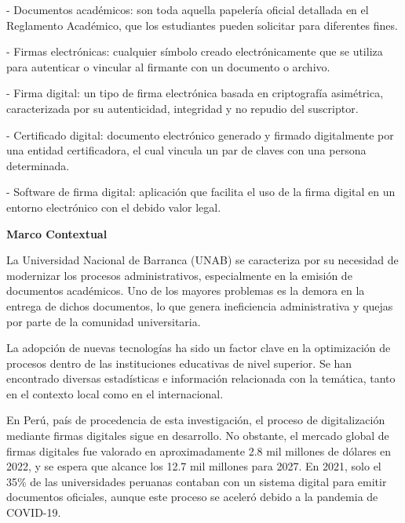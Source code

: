 \documentclass[a4paper,12pt]{article}
\begin{document}
{\small {\selectfont - Documentos académicos: son toda aquella papelería oficial detallada en el Reglamento Académico, que los estudiantes pueden solicitar para diferentes fines.}}

{\small {\selectfont - Firmas electrónicas: cualquier símbolo creado electrónicamente que se utiliza para autenticar o vincular al firmante con un documento o archivo.}}

{\small {\selectfont - Firma digital: un tipo de firma electrónica basada en criptografía asimétrica, caracterizada por su autenticidad, integridad y no repudio del suscriptor.}}

{\small {\selectfont - Certificado digital: documento electrónico generado y firmado digitalmente por una entidad certificadora, el cual vincula un par de claves con una persona determinada.}}

{\small {\selectfont - Software de firma digital: aplicación que facilita el uso de la firma digital en un entorno electrónico con el debido valor legal.}}



{\small {\selectfont \textbf{	Marco Contextual}}}

{\small {\selectfont 	La Universidad Nacional de Barranca (UNAB) se caracteriza por su necesidad de modernizar los procesos administrativos, especialmente en la emisión de documentos académicos. Uno de los mayores problemas es la demora en la entrega de dichos documentos, lo que genera ineficiencia administrativa y quejas por parte de la comunidad universitaria.}}

{\small {\selectfont 	La adopción de nuevas tecnologías ha sido un factor clave en la optimización de procesos dentro de las instituciones educativas de nivel superior. Se han encontrado diversas estadísticas e información relacionada con la temática, tanto en el contexto local como en el internacional.}}

{\small {\selectfont 	En Perú, país de procedencia de esta investigación, el proceso de digitalización mediante firmas digitales sigue en desarrollo. No obstante, el mercado global de firmas digitales fue valorado en aproximadamente 2.8 mil millones de dólares en 2022, y se espera que alcance los 12.7 mil millones para 2027. En 2021, solo el 35\% de las universidades peruanas contaban con un sistema digital para emitir documentos oficiales, aunque este proceso se aceleró debido a la pandemia de COVID-19.}}
\end{document}
